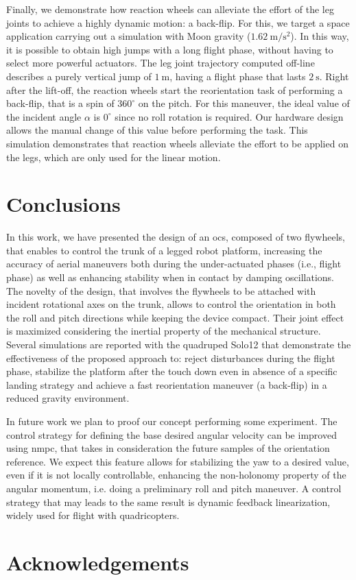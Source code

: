 \documentclass[letterpaper, 10 pt, conference]{ieeeconf}  %
\begin{document}
Finally, we demonstrate how reaction wheels can alleviate the effort of the leg joints to achieve a highly dynamic motion: a back-flip. 
For this, we target a space application carrying out a simulation with Moon gravity ($1.62 \ \mathrm{m/s^2}$).
In this way, it is possible to obtain high jumps with a long flight phase, without having to select more powerful actuators.  
The leg joint trajectory computed off-line describes a purely vertical jump of $1 \ \mathrm{m}$, having a flight phase that lasts $2 \ \mathrm{s}$.
Right after the lift-off, the reaction wheels start the reorientation task of performing a back-flip, that is a spin of $360^\circ$ on the pitch.
For this maneuver, the ideal value of the incident angle $\alpha$ is $0^\circ$ since no roll rotation is required.
Our hardware design allows the manual change of this value before performing the task.
This simulation demonstrates that reaction wheels alleviate the effort to be applied on the legs, which are only used for the linear motion.


\section{Conclusions}
\label{sec:conclusions}

In this work, we have presented the design of an \gls{ocs}, composed of two flywheels, that enables to control the trunk of a legged robot platform, 
increasing the accuracy of aerial maneuvers both during the under-actuated phases (i.e., flight phase) as well as 
enhancing stability when in contact by damping oscillations.
The novelty of the design, that involves the flywheels to be attached with incident rotational axes on the trunk, allows to control the orientation
in both the roll and pitch directions while keeping the device compact. Their joint effect is maximized considering the inertial property of the mechanical structure. 
Several simulations are reported with the quadruped Solo12 that demonstrate the effectiveness of the proposed approach to: 
reject disturbances during the flight phase, stabilize the platform after the touch down even in absence of a specific landing strategy and 
achieve a fast reorientation maneuver (a back-flip) in a reduced gravity environment. 

In future work we plan to proof our concept performing some experiment. 
The control strategy for defining the base desired angular velocity can be improved using \gls{nmpc}, that takes in consideration the future samples of the orientation reference.
We expect this feature allows for stabilizing the yaw to a desired value, even if it is not locally controllable, enhancing the non-holonomy property of the angular momentum, i.e. doing a preliminary roll and pitch maneuver. 
A control strategy that may leads to the same result is dynamic feedback linearization, widely used for flight with quadricopters.



\small
\section*{Acknowledgements}	



\printbibliography
\end{document}
